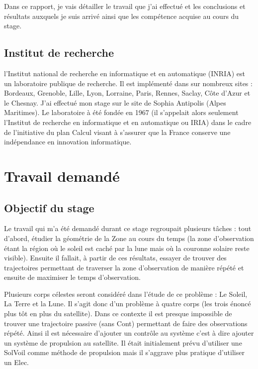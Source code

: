 \documentclass[12pt]{article} %
\begin{document}
		Dans ce rapport, je vais détailler le travail que j'ai effectué et les conclusions et résultats auxquels je suis arrivé ainsi que les compétence acquise au cours du stage. 
		 
		\subsection{Institut de recherche}
		
		l'Institut national de recherche en informatique et en automatique (INRIA) est un laboratoire publique de recherche. Il est implémenté dans sur nombreux sites :  Bordeaux, Grenoble, Lille, Lyon, Lorraine, Paris, Rennes, Saclay, Côte d'Azur et le Chesnay. J'ai effectué mon stage sur le site de Sophia Antipolis (Alpes Maritimes). Le laboratoire à été fondée en 1967 (il s'appelait alors seulement l'Institut de recherche en informatique et en automatique ou IRIA) dans le cadre de l'initiative du plan Calcul visant à s'assurer que la France conserve une indépendance en innovation informatique.
		
		
		\newpage
		\section{Travail demandé}
		\subsection{Objectif du stage}
		Le travail qui m'a été demandé durant ce stage regroupait plusieurs tâches : tout d'abord, étudier la géométrie de la \gls{Zone} au cours du temps (la zone d'observation étant la région où le soleil est caché par la lune mais où la couronne solaire reste visible). Ensuite il fallait, à partir de ces résultats, essayer de trouver des trajectoires permettant de traverser la zone d'observation de manière répété et ensuite de maximiser le temps d'observation.
		
		Plusieurs corps célestes seront considéré dans l'étude de ce problème : Le Soleil, La Terre et la Lune. Il s'agit donc d'un problème à quatre corps (les trois énoncé plus tôt en plus du satellite). Dans ce contexte il est presque impossible de trouver une trajectoire passive (sans \gls{Cont}) permettant de faire des observations répété. Ainsi il est nécessaire d'ajouter un contrôle au système c'est à dire ajouter un système de propulsion au satellite. Il était initialement prévu d'utiliser une \gls{SolVoil} comme méthode de propulsion mais il s'aggrave plus pratique d'utiliser un \gls{Elec}.
			
\end{document}
